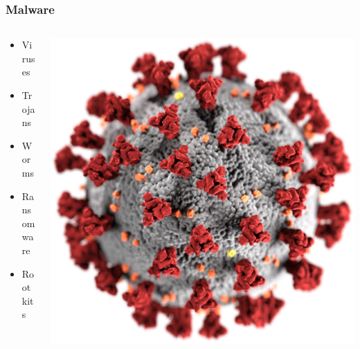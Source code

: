 \documentclass[aspectratio=169]{beamer}              %
\begin{document}
\begin{frame}
    \frametitle{Malware}
        \begin{columns}
            \begin{column}{0.5\textwidth}
    
                \begin{itemize}
                    \item Viruses
                    \item Trojans
                    \item Worms
                    \item Ransomware
                    \item Rootkits
                \end{itemize}
        
            \end{column}
    
            \begin{column}{0.5\textwidth}
    
                \includegraphics[width = \textwidth, height = .85\textheight, keepaspectratio]{figures/Covid.png}
    
            \end{column}
    
        \end{columns}


\end{frame}
\end{document}

